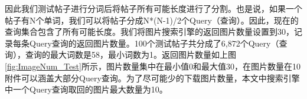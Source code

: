 因此我们测试帖子进行分词后将帖子所有可能长度进行了分割。也是说，如果一个帖子有N个单词，我们可以将帖子分成N*(N-1)/2个Query（查询）。因此，现在的查询集合包含了所有可能长度。我们将图片搜索引擎的返回图片数量设置到30，记录每条Query查询的返回图片数量。100个测试帖子共分成了6,872个Query（查询），查询的最大词数是58，最小词数为1。返回图片数量如上图\ref{fig:ImageNum_Test}所示，图片数量集中在最小值0和最大值30，在图片数量在10附件可以涵盖大部分Query查询。为了尽可能少的下载图片数量，本文中搜索引擎中一个Query查询取回的图片最大数量为10。






